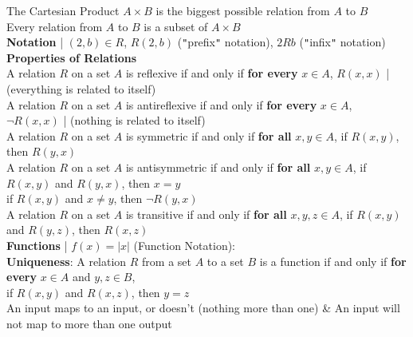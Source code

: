 \documentclass{article}
\begin{document}
		\indent{}The Cartesian Product $A \times B$ is the biggest possible relation from $A$ to $B$ \\
		\indent{}Every relation from $A$ to $B$ is a subset of $A \times B$ \\
	\indent{}\textbf{Notation} | $(2,b) \in R$, $R(2,b)$ (\verb|"|prefix\verb|"| notation), $2Rb$ (\verb|"|infix\verb|"| notation) \\
	\indent{}\textbf{Properties of Relations} \\
		\indent{\hspace{\parindent}}A relation $R$ on a set $A$ is reflexive if and only if \textbf{for every} $x \in A$, $R(x, x)$ | (everything is related to itself) \\
		\indent{\hspace{\parindent}}A relation $R$ on a set $A$ is antireflexive if and only if \textbf{for every} $x \in A$, $\neg R(x,x)$ | (nothing is related to itself) \\
		\indent{\hspace{\parindent}}A relation $R$ on a set $A$ is symmetric if and only if \textbf{for all} $x,y \in A$, if $R(x,y)$, then $R(y,x)$ \\
		\indent{\hspace{\parindent}}A relation $R$ on a set $A$ is antisymmetric if and only if \textbf{for all} $x,y \in A$, if $R(x,y)$ and $R(y,x)$, then $x = y$ \\
			\indent{\hspace{\parindent}\hspace{\parindent}}if $R(x,y)$ and $x \neq y$, then $\neg R(y,x)$ \\
		\indent{\hspace{\parindent}}A relation $R$ on a set $A$ is transitive if and only if \textbf{for all} $x,y,z \in A$, if $R(x,y)$ and $R(y,z)$, then $R(x,z)$ \\
\textbf{Functions} | $f(x) = |x|$ (Function Notation): \\
	\indent{}\textbf{Uniqueness}: A relation $R$ from a set $A$ to a set $B$ is a function if and only if \textbf{for every} $x \in A$ and $y,z \in B$, \\
		\indent{\hspace{\parindent}\hspace{\parindent}}if $R(x,y)$ and $R(x,z)$, then $y = z$ \\
		\indent{\hspace{\parindent}}An input maps to an input, or doesn't (nothing more than one) \& An input will not map to more than one output \\
\end{document}

